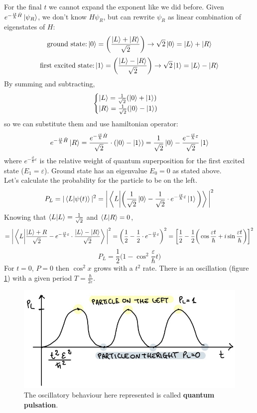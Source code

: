 For the final $t$ we cannot expand the exponent like we did before. Given $e^{-\frac{it}{\hbar}\hat{H}}\ket{\psi_R}$, we don't know $H\psi_R$, but can rewrite $\psi_R$ as linear combination of eigenstates of $H$:
\[
\text{ground state:} \ket{0}=\bigg(\frac{\ket{L}+\ket{R}}{\sqrt{2}}\bigg) \rightarrow \sqrt{2}\ket{0}= \ket{L}+\ket{R}
\]
\[
\text{first excited state:} \ket{1}=\bigg(\frac{\ket{L}-\ket{R}}{\sqrt{2}}\bigg) \rightarrow \sqrt{2}\ket{1}= \ket{L}-\ket{R}
\]
By summing and subtracting,
\[
\begin{cases}
\ket{L}=\frac{1}{\sqrt{2}}(\ket{0}+\ket{1})\\
\ket{R}=\frac{1}{\sqrt{2}}(\ket{0}-\ket{1})
\end{cases}
\]
so we can substitute them and use hamiltonian operator:
\[
e^{-\frac{it}{\hbar}\hat{H}}\ket{R}=\frac{e^{-\frac{it}{\hbar}\hat{H}}}{\sqrt{2}}\cdot (\ket{0}-\ket{1})=\frac{1}{\sqrt{2}}\ket{0}-\frac{e^{-\frac{it}{\hbar}\varepsilon}}{\sqrt{2}}\ket{1}
\]
where $e^{-\frac{it}{\hbar}\varepsilon}$ is the relative weight of quantum superposition for the first excited state ($E_1=\varepsilon$). Ground state has an eigenvalue $E_0=0$ as stated above.\\
Let's calculate the probability for the particle to be on the left.\\
\[
P_L=|\braket{L}{\psi(t)}|^2=\bigg|\braket{L}{\bigg(\frac{1}{\sqrt{2}}\ket{0}-\frac{1}{\sqrt{2}}\cdot e^{-\frac{it}{\hbar}\varepsilon} \ket{1} \bigg)}\bigg|^2
\]
Knowing that $\braket{L}{L}=\frac{1}{\sqrt{2}}$ and $\braket{L}{R}=0$,
\[
=\bigg|\braket{L}{\frac{\ket{L}+{R}}{\sqrt{2}}-e^{-\frac{it}{\hbar}\varepsilon}\cdot\frac{\ket{L}-\ket{R}}{\sqrt{2}}}\bigg|^2
=\bigg(\frac{1}{2}-\frac{1}{2}\cdot e^{-\frac{it}{\hbar}\varepsilon}\bigg)^2
=\bigg[\frac{1}{2}-\frac{1}{2}\bigg(\cos\frac{\varepsilon t}{\hbar}+i\sin\frac{\varepsilon t}{\hbar}\bigg)\bigg]^2
\]
\[
P_L=\frac{1}{2}\bigg(1-\cos^2\frac{\varepsilon}{\hbar}t\bigg)
\]
For $t=0$, $P=0$ then $\cos^2x$ grows with a $t^2$ rate.
There is an oscillation (figure \ref{fig:pulsation}) with a given period $T=\frac{\hbar}{2\varepsilon}$.\\
\begin{figure}[htbp!]
	\centering
	\includegraphics[scale=0.30]{img_3.jpg}

	\caption{The oscillatory behaviour here represented is called \textbf{quantum pulsation}.}
	\label{fig:pulsation}
\end{figure}
\newline

